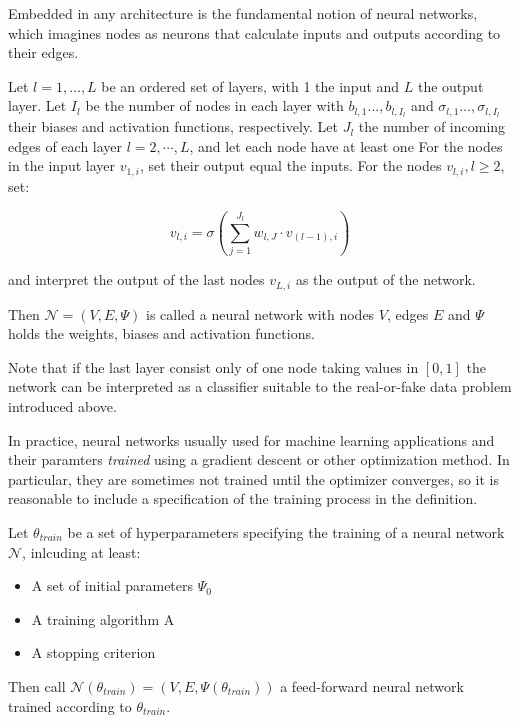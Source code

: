 Embedded in any architecture is the fundamental notion of neural networks, which imagines nodes as neurons that calculate inputs and outputs according to their edges.

\begin{definition}
    Let $l = 1, \dots, L$ be an ordered set of layers, with 1 the input and $L$ the output layer.
    Let $I_l$ be the number of nodes in each layer with $b_{l,1} \dots, b_{l,I_l}$ and $\sigma_{l,1} \dots, \sigma_{l,I_l}$ their biases and activation functions, respectively.
    Let $J_l$ the number of incoming edges of each layer $l = 2, \cdots, L$, and let each node have at least one 
    For the nodes in the input layer $v_{1,i}$, set their output equal the inputs.
    For the nodes $v_{l,i}, l \geq 2$, set:

    \begin{equation}
        v_{l,i} = \sigma (\sum_{j = 1}^{J_l} w_{l,J} \cdot v_{(l-1),i})
    \end{equation}

    and interpret the output of the last nodes $v_{L,i}$ as the output of the network.

    Then $\mathcal{N} = (V, E, \Psi)$ is called a neural network
    with nodes $V$, edges $E$ and $\Psi$ holds the weights, biases and activation functions.%
\end{definition}

Note that if the last layer consist only of one node taking values in $[0,1]$ the network can be interpreted as a classifier suitable to the real-or-fake data problem introduced above.

In practice, neural networks usually used for machine learning applications and their paramters \textit{trained} using a gradient descent or other optimization method.
In particular, they are sometimes not trained until the optimizer converges, so it is reasonable to include a specification of the training process in the definition.

\begin{definition}
    Let $\theta_{train}$ be a set of hyperparameters specifying the training of a neural network $\mathcal{N}$, inlcuding at least:
    \begin{itemize}
        \item A set of initial parameters $\Psi_0$
        \item A training algorithm A
        \item A stopping criterion
    \end{itemize}
    Then call  $\mathcal{N}(\theta_{train}) = (V, E, \Psi(\theta_{train}))$ a feed-forward neural network trained according to $\theta_{train}$.
\end{definition}

